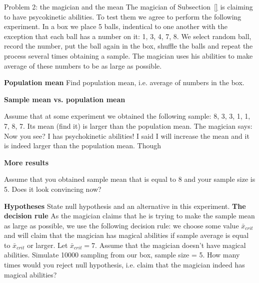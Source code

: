 	\begin{ExerciseList}
 	
		\Exercise Problem 2: the magician and the mean
		The magician of Subsection~\ref{} is claiming to have psycokinetic abilities. To test them we agree to perform the following experiment. In a box we place 5 balls, indentical to one another with the exception that each ball has a number on it: 1, 3, 4, 7, 8. We select random ball, record the number, put the ball again in the box, shuffle the balls and repeat the process several times obtaining a sample. The magician uses his abilities to make average of these numbers to be as large as possible.

	\Question  \textbf{Population mean} Find population mean, i.e. average of numbers in the box.


	\Question \textbf{ Sample mean vs. population mean}

Assume that at some experiment we obtained the following sample: 8, 3, 3, 1, 1, 7, 8, 7. Its mean (find it) is larger than the population mean. The magician says:
 Now you see? I has psychokinetic abilities! I said I will increase the mean and it is indeed larger than the population mean. Though 


	\Question \textbf{More results}

Assume that you obtained sample mean that is equal to 8 and your sample size is 5. Does it look convincing now?


 	\Question \textbf{Hypotheses}  State null hypothesis and an alternative in this experiment.
	\Question \textbf{ The decision rule} As the magician claims that he is trying to make the sample mean as large as possible, we use the following decision rule: we choose some value $\bar x_{crit}$ and will claim that the magician has magical abilities if sample average is equal to $\bar x_{crit}$ or larger. Let $\bar x_{crit}=7$. Assume that the magician doesn't have magical abilities. Simulate 10000 sampling from our box, sample size = 5. How many times would you reject null hypothesis, i.e. claim that the magician indeed has magical abilities?



\end{ExerciseList}
